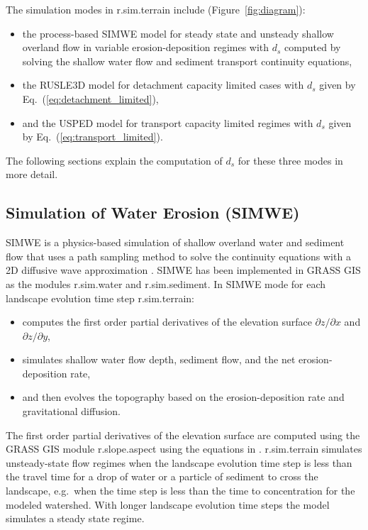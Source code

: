\documentclass[gmd, manuscript]{copernicus}
\begin{document}
The simulation modes in r.sim.terrain include (Figure~\ref{fig:diagram}):
\begin{itemize}
  \item the process-based SIMWE model 
  for steady state and unsteady shallow overland flow 
  in variable erosion-deposition regimes
  with $d_s$ computed by solving the shallow water flow 
  and sediment transport continuity equations,
  \item the RUSLE3D model for detachment capacity limited cases
  with $d_s$ given by Eq.~(\ref{eq:detachment_limited}),
  \item and the USPED model for transport capacity limited regimes
  with $d_s$ given by Eq.~(\ref{eq:transport_limited}).
\end{itemize}

\noindent The following sections explain the computation of $d_s$ for these three modes in more detail.

\subsection{Simulation of Water Erosion (SIMWE)} \label{simwe}
SIMWE is a physics-based simulation of shallow overland water and sediment flow
that uses a path sampling method to solve the continuity equations 
with a 2D diffusive wave approximation 
\citep{Mitas1998,Mitasova2004}.
SIMWE has been implemented in GRASS GIS as the modules 
r.sim.water
and r.sim.sediment. 
In SIMWE mode for each landscape evolution time step
r.sim.terrain:
\begin{itemize}
\item computes the first order partial derivatives of the elevation surface
$\partial z / \partial x$ and $\partial z / \partial y$,
\item simulates shallow water flow depth, sediment flow, and the net erosion-deposition rate, 
\item and then evolves the topography based on the erosion-deposition rate and gravitational diffusion. 
\end{itemize}
%
The first order partial derivatives of the elevation surface
are computed using the GRASS GIS module r.slope.aspect 
using the equations in \cite{Hofierka2009}.
r.sim.terrain simulates unsteady-state flow regimes
when the landscape evolution time step is less than the travel time 
for a drop of water or a particle of sediment to cross the landscape,
e.g.~when the time step is less than the 
time to concentration for the modeled watershed.
With longer landscape evolution time steps 
the model simulates a steady state regime. 
\end{document}
